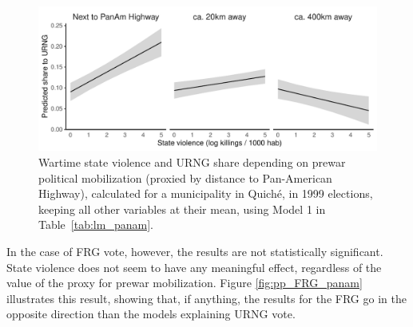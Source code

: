 \documentclass[12pt, notitlepage]{article}
\begin{document}
\begin{figure}[htb!]
  \centering
    \includegraphics[width = .75\textwidth]{img/pp_URNG_panam}

  \caption{Wartime state violence and URNG share depending on prewar political mobilization (proxied by distance to Pan-American Highway), calculated for a municipality in Quiché, in 1999 elections, keeping all other variables at their mean, using Model 1 in Table~\ref{tab:lm_panam}.} \label{fig:pp_URNG_panam}


\end{figure}

In the case of FRG vote, however, the results are not statistically significant.
State violence does not seem to have any meaningful effect, regardless of the value of the proxy for prewar mobilization.
Figure \ref{fig:pp_FRG_panam} illustrates this result, showing that, if anything, the results for the FRG go in the opposite direction than the models explaining URNG vote.
\end{document}

